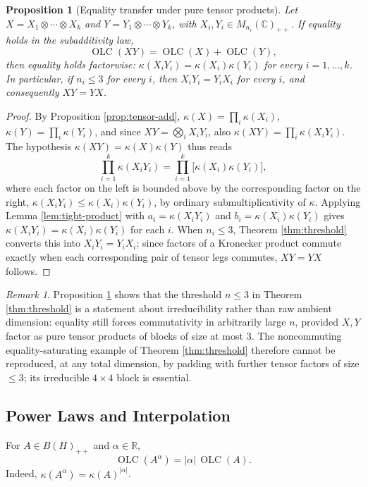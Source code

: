 \documentclass{article}
\newtheorem{proposition}[theorem]{Proposition}
\theoremstyle{remark}
\newtheorem{remark}[theorem]{Remark}
\providecommand{\QLC}{\operatorname{OLC}}
\begin{document}
\begin{proposition}[Equality transfer under pure tensor products]\label{prop:tensor-transfer}
Let $X=X_1\otimes\cdots\otimes X_k$ and $Y=Y_1\otimes\cdots\otimes Y_k$, with $X_i,Y_i\in M_{n_i}(\mathbb{C})_{++}$. If equality holds in the subadditivity law,
\[
\QLC(XY) = \QLC(X)+\QLC(Y),
\]
then equality holds factorwise: $\kappa(X_iY_i)=\kappa(X_i)\kappa(Y_i)$ for every $i=1,\dots,k$. In particular, if $n_i\le3$ for every $i$, then $X_iY_i=Y_iX_i$ for every $i$, and consequently $XY=YX$.
\end{proposition}
\begin{proof}
By Proposition \ref{prop:tensor-add}, $\kappa(X)=\prod_i\kappa(X_i)$, $\kappa(Y)=\prod_i\kappa(Y_i)$, and since $XY=\bigotimes_i X_iY_i$, also $\kappa(XY)=\prod_i\kappa(X_iY_i)$. The hypothesis $\kappa(XY)=\kappa(X)\kappa(Y)$ thus reads
\[
\prod_{i=1}^k \kappa(X_iY_i) = \prod_{i=1}^k \big[\kappa(X_i)\kappa(Y_i)\big],
\]
where each factor on the left is bounded above by the corresponding factor on the right, $\kappa(X_iY_i)\le\kappa(X_i)\kappa(Y_i)$, by ordinary submultiplicativity of $\kappa$. Applying Lemma \ref{lem:tight-product} with $a_i=\kappa(X_iY_i)$ and $b_i=\kappa(X_i)\kappa(Y_i)$ gives $\kappa(X_iY_i)=\kappa(X_i)\kappa(Y_i)$ for each $i$. When $n_i\le3$, Theorem \ref{thm:threshold} converts this into $X_iY_i=Y_iX_i$; since factors of a Kronecker product commute exactly when each corresponding pair of tensor legs commutes, $XY=YX$ follows.
\end{proof}

\begin{remark}
Proposition \ref{prop:tensor-transfer} shows that the threshold $n\le3$ in Theorem \ref{thm:threshold} is a statement about irreducibility rather than raw ambient dimension: equality still forces commutativity in arbitrarily large $n$, provided $X,Y$ factor as pure tensor products of blocks of size at most $3$. The noncommuting equality-saturating example of Theorem \ref{thm:threshold} therefore cannot be reproduced, at any total dimension, by padding with further tensor factors of size $\le3$; its irreducible $4\times4$ block is essential.
\end{remark}

\subsection{Power Laws and Interpolation}
For $A\in B(H)_{++}$ and $\alpha\in\mathbb{R}$,
\[
\QLC(A^\alpha) = |\alpha|\,\QLC(A). \tag{5}
\]
Indeed, $\kappa(A^\alpha)=\kappa(A)^{|\alpha|}$.
\end{document}
